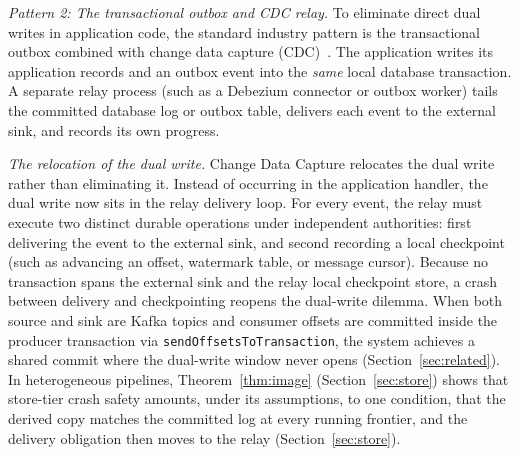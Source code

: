 \documentclass[sigplan,10pt]{acmart}
\theoremstyle{plain}
\theoremstyle{definition}
\let\origtexttt\texttt
\renewcommand{\texttt}[1]{{\origtexttt{\def\_{\textunderscore\allowbreak}#1}}}
\begin{document}
\emph{Pattern 2: The transactional outbox and CDC relay.}
To eliminate direct dual writes in application code, the standard industry
pattern is the transactional outbox combined with change data
capture (CDC)~\cite{kleppmann2015dualwrites,ddia,debezium}. The application
writes its application records and an outbox event into the \emph{same}
local database transaction. A separate relay process (such as a Debezium connector or outbox
worker) tails the committed database log or outbox table, delivers each event
to the external sink, and records its own progress.

\emph{The relocation of the dual write.}
Change Data Capture relocates the dual write rather than eliminating it.
Instead of occurring in the application handler, the dual write now sits
in the relay delivery loop. For every event, the relay must execute two
distinct durable operations under independent authorities: first delivering
the event to the external sink, and second recording a local checkpoint (such
as advancing an offset, watermark table, or message cursor). Because no
transaction spans the external sink and the relay local checkpoint store, a
crash between delivery and checkpointing reopens the dual-write dilemma.
When both source and sink are Kafka topics and consumer offsets are committed
inside the producer transaction via \texttt{sendOffsetsToTransaction}, the
system achieves a shared commit where the dual-write window never opens
(Section~\ref{sec:related}). In heterogeneous pipelines,
Theorem~\ref{thm:image} (Section~\ref{sec:store}) shows that store-tier
crash safety amounts, under its assumptions, to one condition, that the
derived copy matches the committed log at every running frontier, and the
delivery obligation then moves to the relay (Section~\ref{sec:store}).
\end{document}
